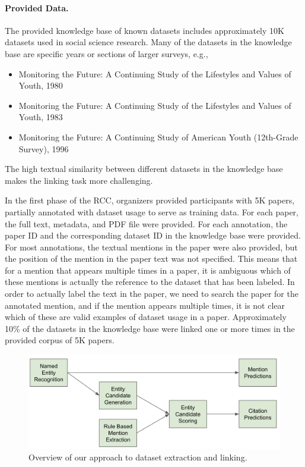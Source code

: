 \paragraph{Provided Data.}
The provided knowledge base of known datasets includes approximately 10K datasets used in social science research.
Many of the datasets in the knowledge base are specific years or sections of larger surveys, e.g.,
\begin{itemize}
    \item  Monitoring the Future: A Continuing Study of the Lifestyles and Values of Youth, 1980 
    \item Monitoring the Future: A Continuing Study of the Lifestyles and Values of Youth, 1983
    \item Monitoring the Future: A Continuing Study of American Youth (12th-Grade Survey), 1996
\end{itemize}
The high textual similarity between different datasets in the knowledge base makes the linking task more challenging.

In the first phase of the RCC, organizers provided participants with 5K papers, partially annotated with dataset usage to serve as training data.
For each paper, the full text, metadata, and PDF file were provided.
For each annotation, the paper ID and the corresponding dataset ID in the knowledge base were provided.
For most annotations, the textual mentions in the paper were also provided, but the position of the mention in the paper text was not specified. This means that for a mention that appears multiple times in a paper, it is ambiguous which of these mentions is actually the reference to the dataset that has been labeled. In order to actually label the text in the paper, we need to search the paper for the annotated mention, and if the mention appears multiple times, it is not clear which of these are valid examples of dataset usage in a paper.
Approximately 10\% of the datasets in the knowledge base were linked one or more times in the provided corpus of 5K papers.

\begin{figure}[h]
\centering
\includegraphics[width=13cm]{datasets.png}
\caption{Overview of our approach to dataset extraction and linking.}\label{fig:datasets}
\end{figure}

